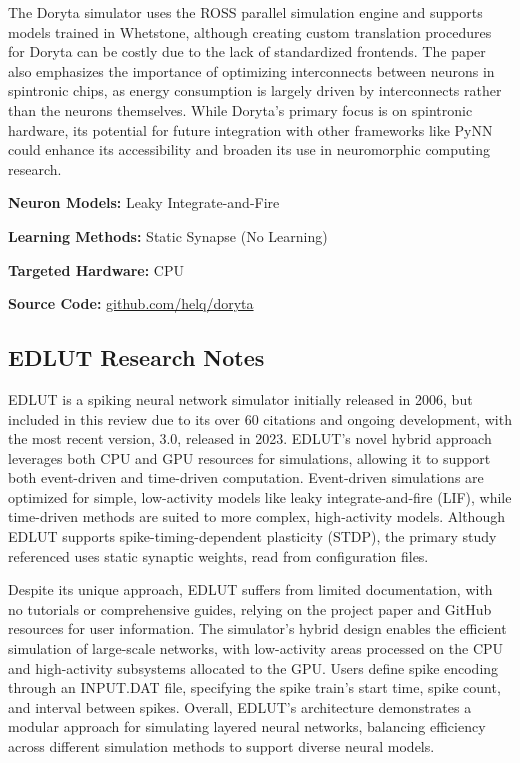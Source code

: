 The Doryta simulator uses the ROSS parallel simulation engine and supports models trained in Whetstone, although creating custom translation procedures for Doryta can be costly due to the lack of standardized frontends. The paper also emphasizes the importance of optimizing interconnects between neurons in spintronic chips, as energy consumption is largely driven by interconnects rather than the neurons themselves. While Doryta's primary focus is on spintronic hardware, its potential for future integration with other frameworks like PyNN could enhance its accessibility and broaden its use in neuromorphic computing research.

\begin{tcolorbox}[enhanced,attach boxed title to top center={yshift=-3mm,yshifttext=-1mm}, colback=blue!5!white,colframe=blue!75!black,colbacktitle=red!80!black, title=Doryta at a Glance,fonttitle=\bfseries, boxed title style={size=small,colframe=red!50!black} ]

\textbf{Neuron Models:} Leaky Integrate-and-Fire

\textbf{Learning Methods:} Static Synapse (No Learning)  

\textbf{Targeted Hardware:} CPU 

\textbf{Source Code:} \href{https://github.com/helq/doryta}{github.com/helq/doryta}
\end{tcolorbox}
\subsection*{EDLUT Research Notes}\label{EDLUT}

EDLUT is a spiking neural network simulator initially released in 2006, but included in this review due to its over 60 citations and ongoing development, with the most recent version, 3.0, released in 2023. EDLUT’s novel hybrid approach leverages both CPU and GPU resources for simulations, allowing it to support both event-driven and time-driven computation. Event-driven simulations are optimized for simple, low-activity models like leaky integrate-and-fire (LIF), while time-driven methods are suited to more complex, high-activity models. Although EDLUT supports spike-timing-dependent plasticity (STDP), the primary study referenced uses static synaptic weights, read from configuration files.

Despite its unique approach, EDLUT suffers from limited documentation, with no tutorials or comprehensive guides, relying on the project paper and GitHub resources for user information. The simulator’s hybrid design enables the efficient simulation of large-scale networks, with low-activity areas processed on the CPU and high-activity subsystems allocated to the GPU. Users define spike encoding through an INPUT.DAT file, specifying the spike train’s start time, spike count, and interval between spikes. Overall, EDLUT’s architecture demonstrates a modular approach for simulating layered neural networks, balancing efficiency across different simulation methods to support diverse neural models.

